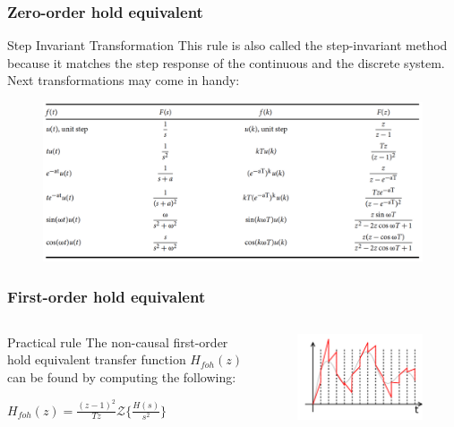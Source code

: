\begin{frame}
	\frametitle{Zero-order hold equivalent}
	\begin{block}{Step Invariant Transformation}
		This rule is also called the step-invariant method because it matches the step response of the continuous and the discrete system. Next transformations may come in handy:
		\begin{figure}
			\centering
			\includegraphics[width=0.85\linewidth]{step_inv}
		\end{figure}
	\end{block}
\end{frame}

\begin{frame}
	\frametitle{First-order hold equivalent}
\begin{columns}
	\begin{column}{0.5\textwidth}
	\begin{block}{Practical rule}
		The non-causal first-order hold equivalent transfer function $H_{foh}(z)$ can be found by computing the following:
		\begin{center}
			$H_{foh}(z) = \frac{(z-1)^{2}}{Tz} \mathcal{Z}\{\frac{H(s)}{s^{2}}\}$
		\end{center}
	\end{block}
	\end{column}
	
	\begin{column}{0.5\textwidth}
		\begin{figure}
			\centering
			\includegraphics[width=1\linewidth]{first-order}
		\end{figure}
	\end{column}
\end{columns}
\end{frame}

